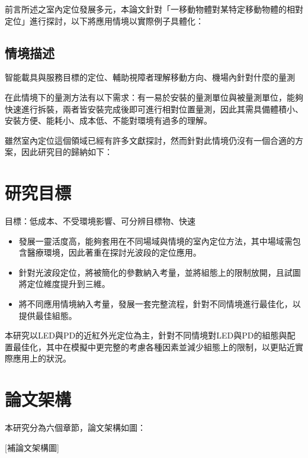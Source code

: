 前言所述之室內定位發展多元，本論文針對「一移動物體對某特定移動物體的相對定位」進行探討，以下將應用情境以實際例子具體化：

\subsection{情境描述}
智能載具與服務目標的定位、輔助視障者理解移動方向、機場內針對什麼的量測 

在此情境下的量測方法有以下需求：有一易於安裝的量測單位與被量測單位，能夠快速進行拆裝，兩者皆安裝完成後即可進行相對位置量測，因此其需具備體積小、安裝方便、能耗小、成本低、不能對環境有過多的理解。

雖然室內定位這個領域已經有許多文獻探討，然而針對此情境仍沒有一個合適的方案，因此研究目的歸納如下：


\section{研究目標}


目標：低成本、不受環境影響、可分辨目標物、快速

\begin{itemize} 
    \item 發展一靈活度高，能夠套用在不同場域與情境的室內定位方法，其中場域需包含醫療環境，因此著重在探討光波段的定位應用。  
    \item 針對光波段定位，將被簡化的參數納入考量，並將組態上的限制放開，且試圖將定位維度提升到三維。
    \item 將不同應用情境納入考量，發展一套完整流程，針對不同情境進行最佳化，以提供最佳組態。
\end{itemize}

本研究以LED與PD的近紅外光定位為主，針對不同情境對LED與PD的組態與配置最佳化，其中在模擬中更完整的考慮各種因素並減少組態上的限制，以更貼近實際應用上的狀況。

\section{論文架構}
本研究分為六個章節，論文架構如圖：

[補論文架構圖]


